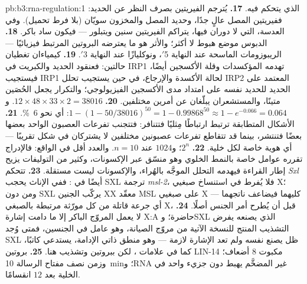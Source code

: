 \begin{solution}{pb:b3:rna-regulation:1}
الذي يتحكم فيه.
\textbf{17.} يُترجم الفيريتين بصرف النظر عن الحديد: ففيريتين المصل
عالٍ جدًا، وحديد المصل والمخزون سويّان (بلا فرط تحميل). وفي العدسة،
التي لا دوران فيها، يتراكم الفيريتين سنين ويتبلور --- فيكون ساد
باكر.
\textbf{18.} الدبوس موضع هبوط لا أكثر؛ والأثر هو ما يعترضه البروتين
المرتبط فيزيائيًا --- الريبوزومات الماسحة عند النهاية
5$'$، ونوكليازًا عند النهاية 3$'$.
\textbf{19.} كيمياءان تغطيان حالتين: فعنقود الحديد والكبريت في
IRP1 تهدمه المؤكسدات وقلة الأكسجين أيضًا، فيستجيب IRP1 لحالة
الأكسدة والإرجاع، في حين يستجيب تحلل IRP2 المعتمد على الحديد
للحديد نفسه على امتداد مدى الأكسجين الفيزيولوجي؛ والتكرار يجعل
الحُصَين متينًا، والمستشعران يبلّغان عن أمرين مختلفين.
\textbf{20.} $12\times 48\times 33\times 2 = \num{38016}$. و$1 - (1 -
50/\num{38016})^{50} = 1 - 0.99868^{50} \approx 1 - e^{-0.066} =
0.064$: أي نحو \qty{6}{\%}.
\textbf{21.} الأشكال المتطابقة ترتبط ارتباطًا مِثليًا فتتنافر: فتتجنب
تفرعات العصبون الواحد بعضها بعضًا فتنتشر، بينما قد تتقاطع تفرعات
عصبونين مختلفين لا يشتركان في شكل تقريبًا --- أي هوية خاصة لكل خلية.
\textbf{22.} $2^{n}$؛ و$\num{1024}$ عند $n = 10$. والعدد أقل في
الواقع: فالإدراج تقرره عوامل خاصة بالنمط الخلوي وهو منسّق
عبر الإكسونات، وكثير من التوليفات يزيح إطار القراءة فيهدمه
التحلل الموجَّه بالهُراء، والإكسونات ليست مستقلة.
\textbf{23.} تتحكم \emph{Sxl} أيضًا في : ففي الإناث
يحجب SXL ترجمة \emph{msl-2}، فلا يُفرط في استنساخ صبغيي X؛ ومن دون
SXL يركّب الجنين XX معقّد MSL على صبغيي X كليهما فيضاعف ناتجهما ---
أي جرعة قاتلة من كل مورّثة مرتبطة بالصبغي X، قبل أن يُطرح أمر الجنس أصلًا.
\textbf{24.} لا يعمل المروّج الباكر إلا ما دامت إشارة X:A حاضرة؛
وSXL الذي يصنعه يفرض التشذيب المنتج للنسخة الآتية من مروّج
الصيانة، وهو عامل في الجنسين، فمتى وُجد SXL ظل يصنع نفسه ولم تعد
الإشارة لازمة --- وهو منطق ذاتي الإدامة،  يستدعي كاتبًا، كما
في علامات ، لكن ببروتين وتشذيب هنا.
\textbf{25.} بروتين LIN-14 مكبوت $8$ أضعاف؛ وزمن نصف مفتاح الرسالة
\qty{10}{min}؛ وRNA غير المضخَّم يهبط دون جزيء واحد في الخلية بعد
$12$ انقسامًا.
\end{solution}
